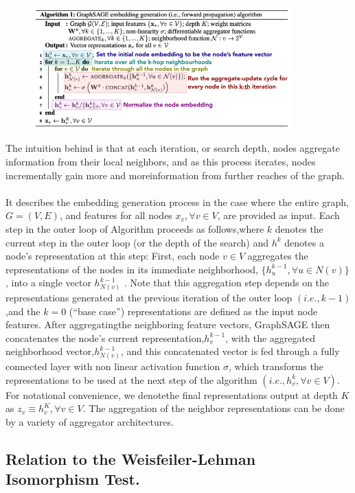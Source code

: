 \documentclass[12pt,a4paper]{article}
\begin{document}
\begin{figure}[h]
\includegraphics[width=10cm]{GraphSAGE-PIC-3}
\centering
\end{figure}
The intuition behind is that at each iteration, or search depth, nodes aggregate information from their local neighbors, and as this process iterates, nodes incrementally gain more and moreinformation from further reaches of the graph.
\\ \\
It describes the embedding generation process in the case where the entire graph,$G=(V,E)$, and features for all nodes $x_{v},\forall v \in V$, are provided as input. Each step in the outer loop of Algorithm proceeds as follows,where $k$ denotes the current step in the outer loop (or the depth of the search) and $h^{k}$ denotes a node’s representation at this step: First, each node $v \in V$ aggregates the representations of the nodes in its immediate neighborhood, $ \{h^{k-1}_{u},\forall u \in N(v)\}$, into a single vector $h^{k-1}_{N(v)}$ . Note that this aggregation step depends on the representations generated at the previous iteration of the outer loop $(i.e.,k-1)$,and the $k= 0$ (“base case”) representations are defined as the input node features. After aggregatingthe neighboring feature vectors, GraphSAGE then concatenates the node’s current representation,$h^{k-1}_{v}$, with the aggregated neighborhood vector,$h^{k-1}_{N(v)}$, and this concatenated vector is fed through a fully connected layer with non linear activation function $\sigma$, which transforms the representations to be used at the next step of the algorithm $(i.e.,h^{k}_{v},\forall v \in V)$. For notational convenience, we denotethe final representations output at depth $K$ as $z_{v} \equiv h^{K}_{v},\forall v \in V$. The aggregation of the neighbor representations can be done by a variety of aggregator architectures.

\subsection*{Relation to the Weisfeiler-Lehman Isomorphism Test.}
\end{document}
